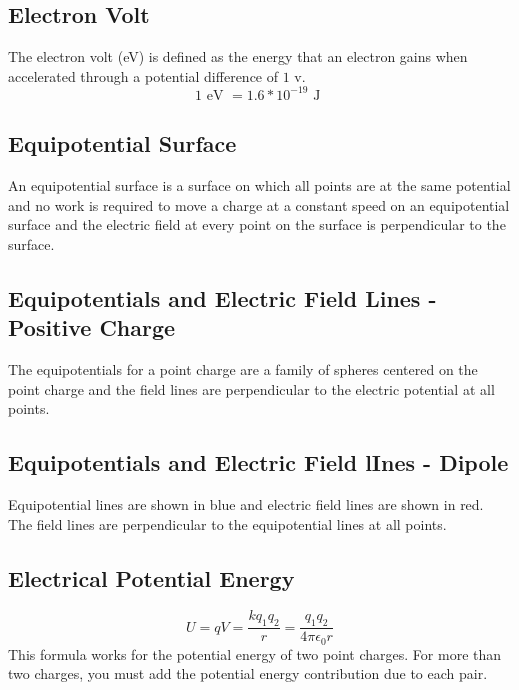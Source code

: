 \subsection{Electron Volt}
The electron volt (eV) is defined as the energy that an electron gains when accelerated through a potential difference of $1$ v.
\[1\text{ eV }=1.6*10^{-19}\text{ J }\]

\subsection{Equipotential Surface}
An equipotential surface is a surface on which all points are at the same potential and no work is required to move a charge at a constant speed on an equipotential surface and the electric field at every point on the surface is perpendicular to the surface.

\subsection{Equipotentials and Electric Field Lines - Positive Charge}
The equipotentials for a point charge are a family of spheres centered on the point charge and the field lines are perpendicular to the electric potential at all points.

\subsection{Equipotentials and Electric Field lInes - Dipole}
Equipotential lines are shown in blue and electric field lines are shown in red. The field lines are perpendicular to the equipotential lines at all points.

\subsection{Electrical Potential Energy}
\[U=qV=\frac{kq_1q_2}{r}=\frac{q_1q_2}{4\pi\epsilon_0r}\]
This formula works for the potential energy of two point charges. For more than two charges, you must add the potential energy contribution due to each pair.
